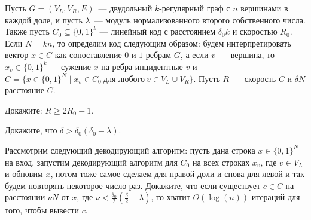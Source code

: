 Пусть $G = (V_L, V_R, E)$~--- двудольный $k$-регулярный граф с $n$ вершинами в каждой доле, и пусть $\lambda$~--- модуль
нормализованного второго собственного числа. Также пусть $C_0 \subseteq \{0, 1\}^k$ --- линейный код с расстоянием $\delta_0
k$ и скоростью $R_0$. Если $N = kn$, то определим код следующим образом: будем интерпретировать вектор $x \in C$ как
сопоставление $0$ и $1$ ребрам $G$, а если $v$~--- вершина, то $x_v \in \{0, 1\}^k$ --- сужение $x$ на ребра инцидентные $v$
и $C = \{x \in \{0, 1\}^N \mid x_v \in C_0~\text{для любого}~v \in V_L \cup V_R\}$. Пусть $R$~--- скорость $C$ и $\delta N$
расстояние $C$.
\begin{enumcyr}
    \item Докажите: $R \ge 2R_0 - 1$.
    \item Докажите, что $\delta > \delta_0 (\delta_0 - \lambda)$.
    \item Рассмотрим следующий декодирующий алгоритм: пусть дана строка $x \in \{0, 1\}^N$ на вход, запустим декодирующий
	    алгоритм для $C_0$ на всех строках $x_v$, где $v \in V_L$ и обновим $x$, потом тоже самое сделаем для правой доли и
        снова для левой и так будем повторять некоторое число раз. Докажите, что если существует $c \in C$ на расстоянии $\nu
        N$ от $x$, где $\nu < \frac{\delta_0}{2} (\frac{\delta}{2} - \lambda)$, то хватит $O(\log(n))$ итераций для того,
        чтобы вывести $c$.
\end{enumcyr}